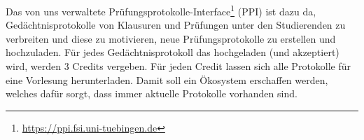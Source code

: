 Das von uns verwaltete
Prüfungsprotokolle-Interface\footnote{\url{https://ppi.fsi.uni-tuebingen.de}}
(PPI) ist dazu da, Gedächtnisprotokolle von Klausuren und Prüfungen unter den
Studierenden zu verbreiten und diese zu motivieren, neue Prüfungsprotokolle zu
erstellen und hochzuladen.  Für jedes Gedächtnisprotokoll das hochgeladen (und
akzeptiert) wird, werden 3 Credits vergeben. Für jeden Credit lassen sich alle
Protokolle für eine Vorlesung herunterladen.  Damit soll ein Ökosystem
erschaffen werden, welches dafür sorgt, dass immer aktuelle Protokolle
vorhanden sind.

